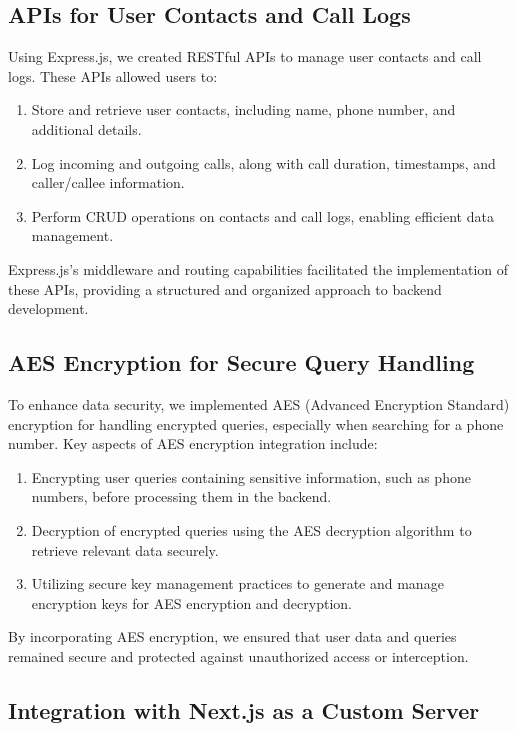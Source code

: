 \subsection{APIs for User Contacts and Call Logs}

Using Express.js, we created RESTful APIs to manage user contacts and call logs. These APIs allowed users to:

\begin{enumerate}
  \item Store and retrieve user contacts, including name, phone number, and additional details.
  \item Log incoming and outgoing calls, along with call duration, timestamps, and caller/callee information.
  \item Perform CRUD operations on contacts and call logs, enabling efficient data management.
\end{enumerate}

Express.js's middleware and routing capabilities facilitated the implementation of these APIs, providing a structured and organized approach to backend development.

\subsection{AES Encryption for Secure Query Handling}

To enhance data security, we implemented AES (Advanced Encryption Standard) encryption for handling encrypted queries, especially when searching for a phone number. Key aspects of AES encryption integration include:

\begin{enumerate}
  \item Encrypting user queries containing sensitive information, such as phone numbers, before processing them in the backend.
  \item Decryption of encrypted queries using the AES decryption algorithm to retrieve relevant data securely.
  \item Utilizing secure key management practices to generate and manage encryption keys for AES encryption and decryption.
\end{enumerate}

By incorporating AES encryption, we ensured that user data and queries remained secure and protected against unauthorized access or interception.

\subsection{Integration with Next.js as a Custom Server}

